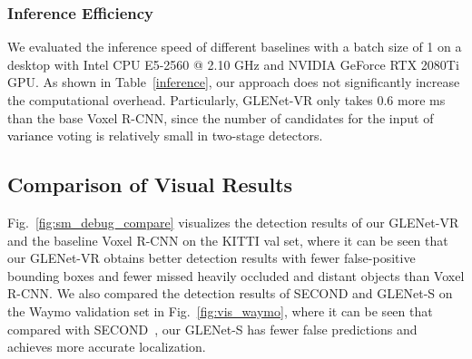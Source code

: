 \documentclass[twocolumn]{svjour3}
\newcommand{\revise}[1]{\textcolor{black}{#1}}
\begin{document}
\subsubsection{Inference Efficiency} We evaluated the inference speed of different baselines with a batch size of 1 on a desktop with Intel CPU E5-2560 @ 2.10 GHz and NVIDIA GeForce RTX 2080Ti GPU. As shown in Table~\ref{inference}, our approach does not significantly increase the computational overhead. Particularly, GLENet-VR only takes 0.6 more ms than the base Voxel R-CNN, since the number of candidates for the input of \revise{variance} voting is relatively small in two-stage detectors.




\subsection{Comparison of Visual Results}\label{qualitative_results}
Fig.~\ref{fig:sm_debug_compare} visualizes the detection results of our GLENet-VR and the baseline Voxel R-CNN on the KITTI val set, where it can be seen that our GLENet-VR obtains better detection results with fewer false-positive bounding boxes and fewer missed heavily occluded and distant objects than Voxel R-CNN. We also compared the detection results of SECOND and GLENet-S on the Waymo validation set in Fig.~\ref{fig:vis_waymo}, where it can be seen that compared with SECOND~\citep{yan2018second}, our GLENet-S has fewer false predictions and achieves more accurate localization.
\end{document}
